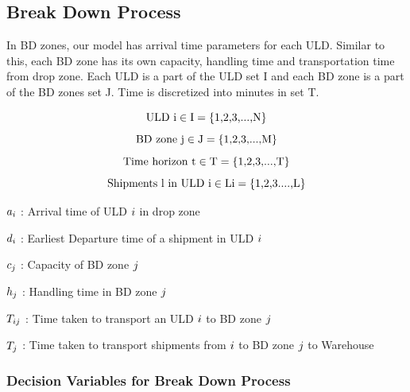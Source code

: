 \documentclass[11pt,a4paper,fleqn]{article}
\begin{document}
\subsection{Break Down Process}
\label{sec:ParamBDZone}

In BD zones, our model has arrival time parameters for each ULD. Similar to this, each BD zone has its own capacity, handling time and transportation time from drop zone. Each ULD is a part of the ULD set I and each BD zone is a part of the BD zones set J. Time is discretized into minutes in set T.

\begin{equation*} ${\color{black} ULD i}$ {}  \in {}  ${\color{black}I}$ {} = {} ${\color{black}\{1,2,3,...,N\}}$  \end{equation*} 
\begin{equation*} ${\color{black} BD zone j}$ {}  \in {}  ${\color{black}J}$ {} = {} ${\color{black}\{1,2,3,...,M\}}$ \end{equation*} 
\begin{equation*} ${\color{black} Time horizon t}$ {}  \in {}  ${\color{black}T}$ {} = {} ${\color{black}\{1,2,3,...,T\}}$ \end{equation*}
\begin{equation*} ${\color{black} Shipments l in ULD i}$ {}  \in {}  ${\color{black}Li}$ {} = {} ${\color{black}\{1,2,3....,L\}}$ \end{equation*} %


${\color{black}a_{i}}$ : Arrival time of ULD ${\color{black}i}$ in drop zone 

${\color{black}d_{i}}$ : Earliest Departure time of a shipment in ULD ${\color{black}i}$ 



${\color{black}c_{j}}$ : Capacity of BD zone ${\color{black}j}$

$\textcolor{black}{h_{j}}$ : Handling time in BD zone ${\color{black}j}$

$\textcolor{black}{T_{ij}}$ : Time taken to transport an ULD ${\color{black}i}$ to BD zone ${\color{black}j}$

$\textcolor{black}{T_{j}}$ : Time taken to transport shipments from ${\color{black}i}$ to BD zone ${\color{black}j}$ to Warehouse


\subsubsection{Decision Variables for Break Down Process}
\label{sec:DVBDZone}
\end{document}
